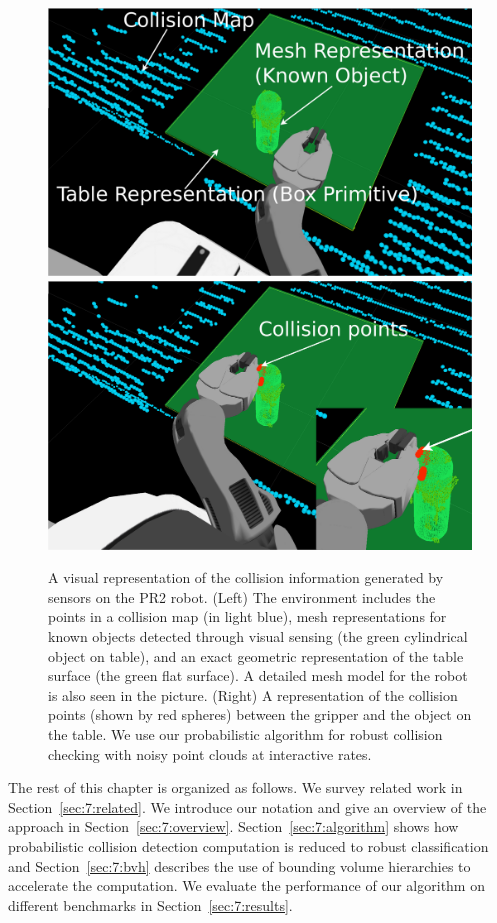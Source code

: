 \begin{figure}[!htb]
  \centering
  \includegraphics[width=0.45\linewidth]{figs/7/labeled_small.png}
  \includegraphics[width=0.45\linewidth]{figs/7/labeled_in_collision_pip.png}
  \caption[A visual representation of the collision information generated by the sensors on the PR2 robot]{\label{fig:7:pr2} A visual representation of the collision information generated by sensors on the PR2 robot. (Left) The environment includes the points in a collision map (in light blue), mesh representations for known objects detected through visual sensing (the green cylindrical object on table), and an exact geometric representation of the table surface (the green flat surface). A detailed mesh model for the robot is also seen in the picture. (Right) A representation of the collision points (shown by red spheres) between the gripper and the object on the table.
We use our probabilistic algorithm for robust collision checking with noisy point clouds at interactive rates.}
\end{figure}

The rest of this chapter is organized as follows. We survey related work in Section~\ref{sec:7:related}.  We introduce our notation and give an overview of the approach in
Section~\ref{sec:7:overview}.
Section~\ref{sec:7:algorithm} shows how probabilistic collision detection computation is reduced to robust classification and Section~\ref{sec:7:bvh} describes the use of bounding volume hierarchies to accelerate the
computation.
We evaluate the performance of our algorithm on different benchmarks in Section~\ref{sec:7:results}.

